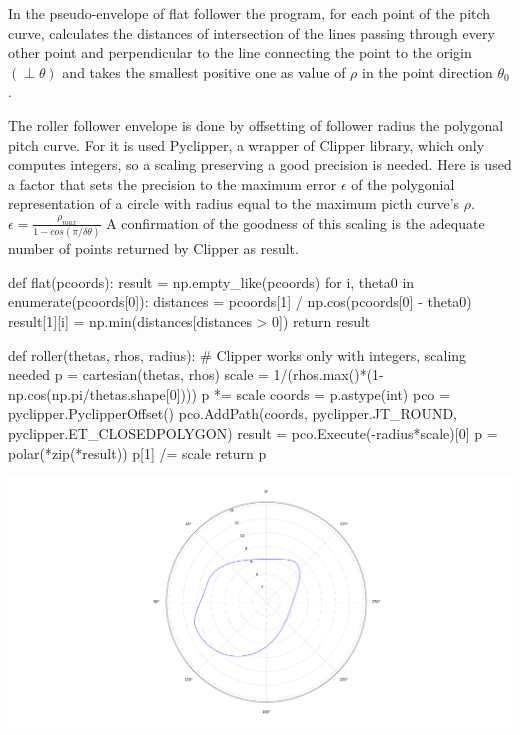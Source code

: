 \documentclass[a4paper,10pt,twoside]{article}
\begin{document}
    In the pseudo-envelope of flat follower the program, for each point of the pitch curve,
    calculates the distances of intersection of the lines passing through every other point
    and perpendicular to the line connecting the point to the origin \((\perp \theta)\)
    and takes the smallest positive one as value of \(\rho\) in the point direction \(\theta_0\).

    The roller follower envelope is done by offsetting of follower radius the polygonal pitch curve.
    For it is used Pyclipper, a wrapper of Clipper library, which only computes integers,
    so a scaling preserving a good precision is needed. Here is used a factor that sets the precision to
    the maximum error \(\epsilon\) of the polygonial representation of a circle with radius equal to
    the maximum picth curve's \(\rho\).\hfill\(\epsilon=\frac{\rho_{max}}{1-cos(\pi/\delta\theta)}\)
    A confirmation of the goodness of this scaling is the adequate number of points returned by Clipper as result.

    \begin{pycode}
    def flat(pcoords):
        result = np.empty_like(pcoords)
        for i, theta0 in enumerate(pcoords[0]):
            distances = pcoords[1] / np.cos(pcoords[0] - theta0)
            result[1][i] = np.min(distances[distances > 0])
        return result
    
    def roller(thetas, rhos, radius):
        # Clipper works only with integers, scaling needed
        p = cartesian(thetas, rhos)
        scale = 1/(rhos.max()*(1-np.cos(np.pi/thetas.shape[0])))
        p *= scale
        coords = p.astype(int)
        pco = pyclipper.PyclipperOffset()
        pco.AddPath(coords, pyclipper.JT_ROUND, pyclipper.ET_CLOSEDPOLYGON)
        result = pco.Execute(-radius*scale)[0]
        p = polar(*zip(*result))
        p[1] /= scale
        return p
    \end{pycode}

    \includegraphics[width=\textwidth]{cam.png}
\end{document}
